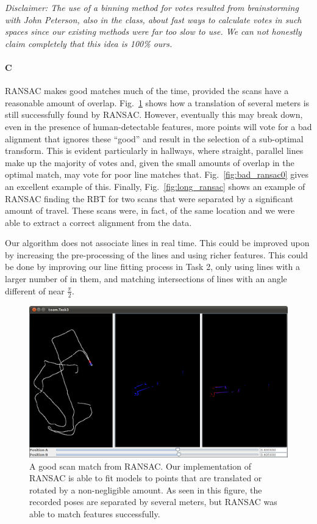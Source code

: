 \documentclass[12pt]{article}
\begin{document}
\emph{Disclaimer: The use of a binning method for votes resulted from brainstorming with John Peterson,
    also in the class, about fast ways to calculate votes in such spaces since our existing methods
    were far too slow to use. We can not honestly claim completely that this idea is 100\% ours.}

\paragraph{C}
RANSAC makes good matches much of the time, provided the scans have a reasonable
amount of overlap. Fig.~\ref{fig:good_ransac0} shows how a translation of several
meters is still successfully found by RANSAC. However, eventually this may break
down, even in the presence of human-detectable features, more points will vote
for a bad alignment that ignores these ``good'' and result in the selection of
a sub-optimal transform. This is evident particularly in hallways, where straight,
parallel lines make up the majority of votes and, given the small amounts of overlap in
the optimal match, may vote for poor line matches that. Fig.~\ref{fig:bad_ransac0} gives
an excellent example of this. Finally, Fig.~\ref{fig:long_ransac} shows an example of
RANSAC finding the RBT for two scans that were separated by a significant amount
of travel. These scans were, in fact, of the same location and we were able to extract
a correct alignment from the data.

Our algorithm does not associate lines in real time.  This could be improved upon by
increasing the pre-processing of the lines and using richer features.  This could be done
by improving our line fitting process in Task 2, only using lines with a larger number of
in them, and matching intersections of lines with an angle different of near $\frac{\pi}{2}$.


\begin{figure}[htb]
\centering
\includegraphics[width=.7\textwidth]{figures/Task3_good0.png}
\caption{A good scan match from RANSAC. Our implementation of RANSAC is able
to fit models to points that are translated or rotated by a non-negligible amount. As seen
in this figure, the recorded poses are separated by several meters, but RANSAC
was able to match features successfully.}
\label{fig:good_ransac0}
\end{figure}
\end{document}
